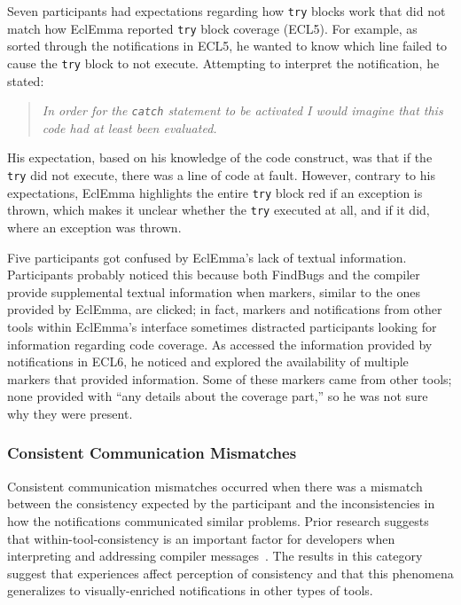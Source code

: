 Seven participants had expectations regarding how \texttt{try} blocks work that did not match how EclEmma reported \texttt{try} block coverage (ECL5).
For example, as  sorted through the notifications in ECL5, he wanted to know which line failed to cause the \texttt{try} block to not execute.
Attempting to interpret the notification, he stated:

\begin{quote}
	\textit{In order for the \texttt{catch} statement to be activated I would imagine that this code had at least been evaluated.}
\end{quote}

\noindent
His expectation, based on his knowledge of the code construct, was that if the \texttt{try} did not execute, there was a line of code at fault. However, contrary to his expectations, EclEmma highlights the entire \texttt{try} block red if an exception is thrown, which makes it unclear whether the \texttt{try} executed at all, and if it did, where an exception was thrown.

Five participants got confused by EclEmma's lack of textual information.
Participants probably noticed this because both FindBugs and the compiler provide supplemental textual information when markers, similar to the ones provided by EclEmma, are clicked; in fact, markers and notifications from other tools within EclEmma's interface sometimes distracted participants looking for information regarding code coverage.
As  accessed the information provided by notifications in ECL6, he noticed and explored the availability of multiple markers that provided information. Some of these markers came from other tools; none provided  with ``any details about the coverage part,'' so he was not sure why they were present.



\subsubsection{Consistent Communication Mismatches}\label{subsec:inconsistent}
Consistent communication mismatches occurred when there was a mismatch between the consistency expected by the participant and the inconsistencies in how the notifications communicated similar problems. 
Prior research suggests that within-tool-consistency is an important factor for developers when interpreting and addressing compiler messages~\cite{Traver:2010:Messages}.
The results in this category suggest that experiences affect perception of consistency and that this phenomena generalizes to visually-enriched notifications in other types of  tools.

